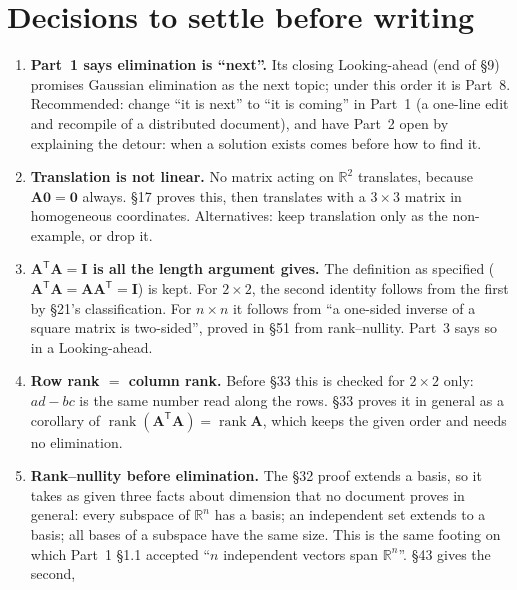 \documentclass[11pt]{article}
\newcommand{\R}{\mathbb{R}}
\newcommand{\vc}[1]{\mathbf{#1}}
\newcommand{\mt}[1]{\mathbf{#1}}
\newcommand{\T}{^{\mathsf{T}}}
\DeclareMathOperator{\rank}{rank}
\begin{document}
\section{Decisions to settle before writing}
\begin{enumerate}[label=\textbf{D\arabic*.},leftmargin=2.4em,itemsep=5pt]
  \item \textbf{Part~1 says elimination is ``next''.} Its closing Looking-ahead
        (end of \S9) promises Gaussian elimination as the next topic; under
        this order it is Part~8. Recommended: change ``it is next'' to ``it is
        coming'' in Part~1 (a one-line edit and recompile of a distributed
        document), and have Part~2 open by explaining the detour: when a
        solution exists comes before how to find it.
  \item \textbf{Translation is not linear.} No matrix acting on $\R^{2}$
        translates, because $\mt{A}\vc{0}=\vc{0}$ always. \S17 proves this, then
        translates with a $3\times3$ matrix in homogeneous coordinates.
        Alternatives: keep translation only as the non-example, or drop it.
  \item \textbf{$\mt{A}\T\mt{A}=\mt{I}$ is all the length argument gives.} The
        definition as specified ($\mt{A}\T\mt{A}=\mt{A}\mt{A}\T=\mt{I}$) is
        kept. For $2\times2$, the second identity follows from the first by
        \S21's classification. For $n\times n$ it follows from ``a one-sided
        inverse of a square matrix is two-sided'', proved in \S51 from
        rank--nullity. Part~3 says so in a Looking-ahead.
  \item \textbf{Row rank $=$ column rank.} Before \S33 this is checked for
        $2\times2$ only: $ad-bc$ is the same number read along the rows. \S33
        proves it in general as a corollary of
        $\rank(\mt{A}\T\mt{A})=\rank\mt{A}$, which keeps the given order and
        needs no elimination.
  \item \textbf{Rank--nullity before elimination.} The \S32 proof extends a
        basis, so it takes as given three facts about dimension that no
        document proves in general: every subspace of $\R^{n}$ has a basis; an
        independent set extends to a basis; all bases of a subspace have the
        same size. This is the same footing on which Part~1 \S1.1 accepted
        ``$n$ independent vectors span $\R^{n}$''. \S43 gives the second,

\end{enumerate}
\end{document}
